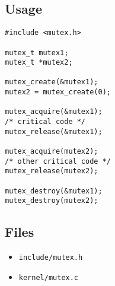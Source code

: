 \documentclass[a4paper]{article}
\begin{document}
\subsection{Usage}
\begin{lstlisting}
#include <mutex.h>

mutex_t mutex1;
mutex_t *mutex2;

mutex_create(&mutex1);
mutex2 = mutex_create(0);

mutex_acquire(&mutex1);
/* critical code */
mutex_release(&mutex1);

mutex_acquire(mutex2);
/* other critical code */
mutex_release(mutex2);

mutex_destroy(&mutex1);
mutex_destroy(mutex2);

\end{lstlisting}


\subsection{Files}
\begin{itemize}
\item \texttt{include/mutex.h}
\item \texttt{kernel/mutex.c}
\end{itemize}
\end{document}
